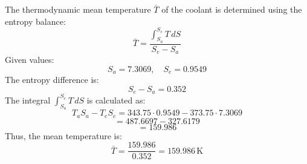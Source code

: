The thermodynamic mean temperature \( \bar{T} \) of the coolant is determined using the entropy balance:  
\[
\bar{T} = \frac{\int_{S_a}^{S_e} T \, dS}{S_e - S_a}
\]  
Given values:  
\[
S_a = 7.3069, \quad S_e = 0.9549
\]  
The entropy difference is:  
\[
S_e - S_a = 0.352
\]  
The integral \( \int_{S_a}^{S_e} T \, dS \) is calculated as:  
\[
T_a S_a - T_e S_e = 343.75 \cdot 0.9549 - 373.75 \cdot 7.3069
\]  
\[
= 487.6697 - 327.6179
\]  
\[
= 159.986
\]  
Thus, the mean temperature is:  
\[
\bar{T} = \frac{159.986}{0.352} = 159.986 \, \text{K}
\]